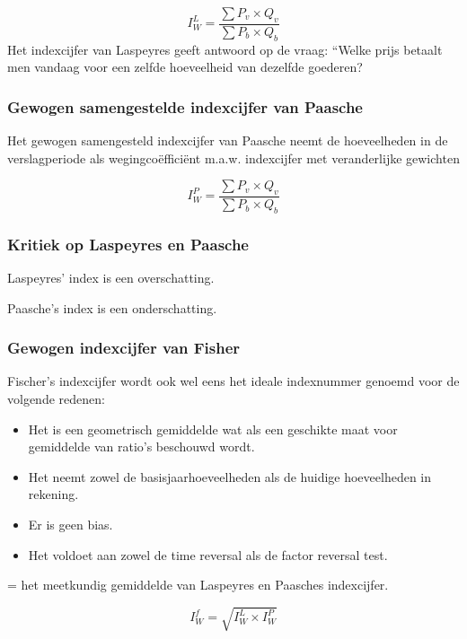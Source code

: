 \documentclass[a4paper,12pt]{article}
\begin{document}
\begin{equation}
I^L_W=\frac{\sum P_v \times Q_v}{\sum P_b \times Q_b}
\end{equation}
Het indexcijfer van Laspeyres geeft antwoord op de vraag: “Welke prijs betaalt men vandaag voor een zelfde hoeveelheid van dezelfde goederen?

\subsubsection{Gewogen samengestelde indexcijfer van Paasche}
Het gewogen samengesteld indexcijfer van Paasche neemt de hoeveelheden in de verslagperiode als wegingcoëfficiënt m.a.w. indexcijfer met veranderlijke gewichten

\begin{equation}
I^P_W=\frac{\sum P_v \times Q_v}{\sum P_b \times Q_b}
\end{equation}

\subsubsection{Kritiek op Laspeyres en Paasche}
Laspeyres' index is een overschatting.

Paasche's index is een onderschatting.

\subsubsection{Gewogen indexcijfer van Fisher}
Fischer’s indexcijfer wordt ook wel eens het ideale indexnummer genoemd voor de volgende redenen:
\begin{itemize}
\item Het is een geometrisch gemiddelde wat als een geschikte maat voor gemiddelde van ratio’s beschouwd wordt.
\item Het neemt zowel de basisjaarhoeveelheden als de huidige hoeveelheden in rekening.
\item Er is geen bias.
\item Het voldoet aan zowel de time reversal als de factor reversal test.
\end{itemize}

= het meetkundig gemiddelde van Laspeyres en Paasches indexcijfer.

\begin{equation}
I^f_W = \sqrt{I^L_W \times I^P_W}
\end{equation}
\end{document}
